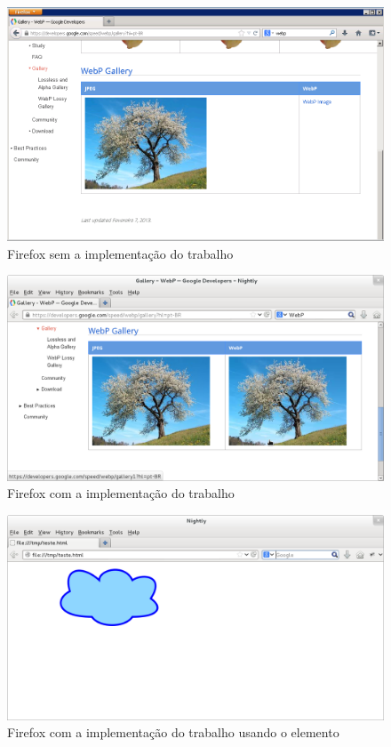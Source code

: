 \documentclass[espaco=simples,appendix=Name]{abnt}
\begin{document}
\begin{citacao}
\end{citacao}

\begin{figure}[h]
  \centering
    \includegraphics[scale=0.4]{FirefoxSemWebP.png}
  \caption{Firefox sem a implementação do trabalho}
\end{figure}

\begin{figure}[h]
  \centering
    \includegraphics[scale=0.4]{FirefoxComWebP.png}
  \caption{Firefox com a implementação do trabalho}
\end{figure}

\begin{figure}[h]
  \centering
    \includegraphics[scale=0.4]{HTML5CanvasFirefoxWebP.png}
  \caption{Firefox com a implementação do trabalho usando o elemento }
\end{figure}
\end{document}
